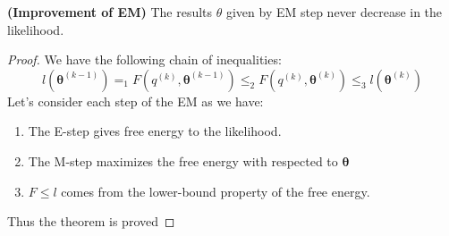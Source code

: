 \begin{theorem}{\textbf{(Improvement of EM)}}
    The results $\theta$ given by EM step never decrease in the likelihood. 
\end{theorem}
\begin{proof}
    We have the following chain of inequalities:
    \begin{equation*}
        l(\boldsymbol \theta^{(k-1)}) =_1 F(q^{(k)}, \boldsymbol \theta^{(k-1)}) \le_2 F(q^{(k)}, \boldsymbol \theta^{(k)}) \le_3 l(\boldsymbol \theta^{(k)})
    \end{equation*}
    Let's consider each step of the EM as we have:
    \begin{enumerate}
        \item The E-step gives free energy to the likelihood.
        \item The M-step maximizes the free energy with respected to $\boldsymbol \theta$
        \item $F\le l$ comes from the lower-bound property of the free energy.
    \end{enumerate}
    Thus the theorem is proved
\end{proof}

